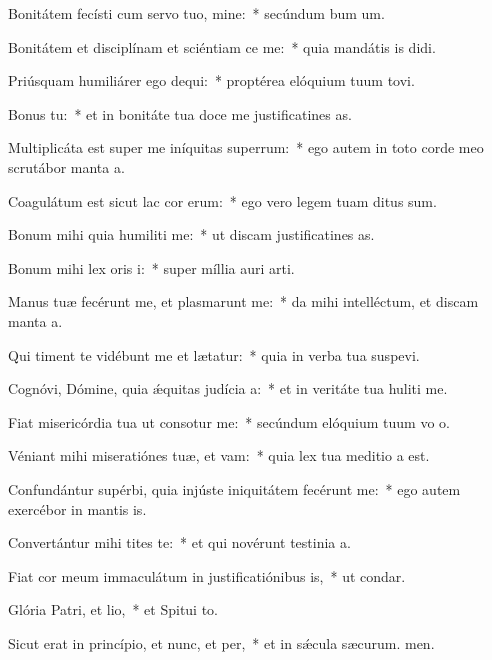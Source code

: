 \item Bonitátem fecísti cum servo tuo, mine:~* secúndum bum um.
\item Bonitátem et disciplínam et sciéntiam ce me:~* quia mandátis is didi.
\item Priúsquam humiliárer ego dequi:~* proptérea elóquium tuum tovi.
\item Bonus  tu:~* et in bonitáte tua doce me justificatines as.
\item Multiplicáta est super me iníquitas superrum:~* ego autem in toto corde meo scrutábor manta a.
\item Coagulátum est sicut lac cor erum:~* ego vero legem tuam ditus sum.
\item Bonum mihi quia humiliti me:~* ut discam justificatines as.
\item Bonum mihi lex oris i:~* super míllia auri  arti.
\item Manus tuæ fecérunt me, et plasmarunt me:~* da mihi intelléctum, et discam manta a.
\item Qui timent te vidébunt me et lætatur:~* quia in verba tua suspevi.
\item Cognóvi, Dómine, quia ǽquitas judícia a:~* et in veritáte tua huliti me.
\item Fiat misericórdia tua ut consotur me:~* secúndum elóquium tuum vo o.
\item Véniant mihi miseratiónes tuæ, et vam:~* quia lex tua meditio a est.
\item Confundántur supérbi, quia injúste iniquitátem fecérunt  me:~* ego autem exercébor in mantis is.
\item Convertántur mihi tites te:~* et qui novérunt testinia a.
\item Fiat cor meum immaculátum in justificatiónibus is,~* ut  condar.
\item Glória Patri, et lio,~* et Spitui to.
\item Sicut erat in princípio, et nunc, et per,~* et in sǽcula sæcurum. men.
